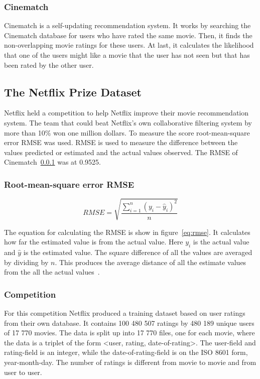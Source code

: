 \subsubsection{Cinematch}
\label{subsec:Cinematch}
Cinematch is a self-updating recommendation system. It works by searching the Cinematch database for users who have rated the same movie. Then, it finds the non-overlapping movie ratings for these users. At last, it calculates the likelihood that one of the users might like a movie that the user has not seen but that has been rated by the other user.


\subsection{The Netflix Prize Dataset}\label{subsec:netflixdata}
Netflix held a competition to help Netflix improve their movie recommendation system. The team that could beat Netflix's own collaborative filtering system by more than 10\% won one million dollars. To measure the score root-mean-square error RMSE was used. RMSE is used to measure the difference between the values predicted or estimated and the actual values observed. The RMSE of Cinematch~\ref{subsec:Cinematch} was at 0.9525.

\subsubsection{Root-mean-square error RMSE}\label{subsubsec:rmse}

\begin{equation}\label{eq:rmse}
RMSE = \sqrt {{\frac{{\sum\limits_{{i = 1}}^n {{{\left( {{y_i} - {{\hat{y}}_i}} \right)}^2}} }}{{n}}}}
\end{equation}

The equation for calculating the RMSE is show in figure~\ref{eq:rmse}. It calculates how far the estimated value is from the actual value. Here ${y_i}$ is the actual value and ${\hat{y}}$ is the estimated value. The square difference of all the values are averaged by dividing by ${n}$. This produces the average distance of all the estimate values from the all the actual values~\cite{rmse}.


\subsubsection{Competition}

For this competition Netflix produced a training dataset based on user ratings from their own database. It contains 100 480 507 ratings by 480 189 unique users of 17 770 movies. The data is split up into 17 770 files, one for each movie, where the data is a triplet of the form <user, rating, date-of-rating>. The user-field and rating-field is an integer, while the date-of-rating-field is on the ISO 8601 form, year-month-day. The number of ratings is different from movie to movie and from user to user.

